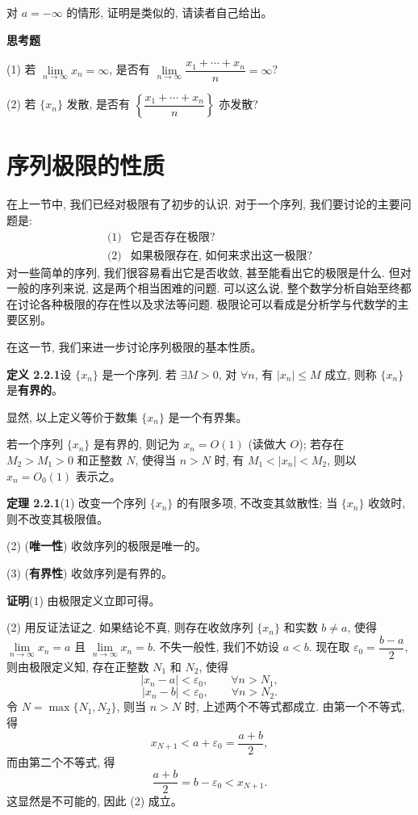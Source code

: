 \documentclass[UTF8,12pt,a4paper,fontset=fandol]{ctexart}
\begin{document}
对 $a=-\infty$ 的情形, 证明是类似的, 请读者自己给出。

\noindent\textbf{思考题}

(1) 若 $\lim\limits_{n\to\infty}x_n=\infty$, 是否有 $\lim\limits_{n\to\infty}\dfrac{x_1+\cdots+x_n}{n}=\infty$?

(2) 若 $\{x_n\}$ 发散, 是否有 $\left\{\dfrac{x_1+\cdots+x_n}{n}\right\}$ 亦发散?

\section{序列极限的性质}

在上一节中, 我们已经对极限有了初步的认识. 对于一个序列, 我们要讨论的主要问题是:
\[
\begin{array}{ll}
  \text{(1)} & \text{它是否存在极限?}\\
  \text{(2)} & \text{如果极限存在, 如何来求出这一极限?}
\end{array}
\]
对一些简单的序列, 我们很容易看出它是否收敛, 甚至能看出它的极限是什么. 但对一般的序列来说, 这是两个相当困难的问题. 可以这么说, 整个数学分析自始至终都在讨论各种极限的存在性以及求法等问题. 极限论可以看成是分析学与代数学的主要区别。

在这一节, 我们来进一步讨论序列极限的基本性质。

\noindent\textbf{定义 2.2.1}\quad 设 $\{x_n\}$ 是一个序列. 若 $\exists M>0$, 对 $\forall n$, 有 $|x_n|\leqslant M$ 成立, 则称 $\{x_n\}$ 是\textbf{有界的}。

显然, 以上定义等价于数集 $\{x_n\}$ 是一个有界集。

若一个序列 $\{x_n\}$ 是有界的, 则记为 $x_n=O(1)$ (读做大 $O$); 若存在 $M_2>M_1>0$ 和正整数 $N$, 使得当 $n>N$ 时, 有 $M_1<|x_n|<M_2$, 则以 $x_n=O_0(1)$ 表示之。

\noindent\textbf{定理 2.2.1}\quad (1) 改变一个序列 $\{x_n\}$ 的有限多项, 不改变其敛散性; 当 $\{x_n\}$ 收敛时, 则不改变其极限值。

(2) (\textbf{唯一性}) 收敛序列的极限是唯一的。

(3) (\textbf{有界性}) 收敛序列是有界的。

\noindent\textbf{证明}\quad (1) 由极限定义立即可得。

(2) 用反证法证之. 如果结论不真, 则存在收敛序列 $\{x_n\}$ 和实数 $b\ne a$, 使得 $\lim\limits_{n\to\infty}x_n=a$ 且 $\lim\limits_{n\to\infty}x_n=b$. 不失一般性, 我们不妨设 $a<b$. 现在取 $\varepsilon_0=\dfrac{b-a}{2}$, 则由极限定义知, 存在正整数 $N_1$ 和 $N_2$, 使得
\[
  |x_n-a|<\varepsilon_0,\qquad \forall n>N_1,
\]
\[
  |x_n-b|<\varepsilon_0,\qquad \forall n>N_2.
\]
令 $N=\max\{N_1,N_2\}$, 则当 $n>N$ 时, 上述两个不等式都成立. 由第一个不等式, 得
\[
  x_{N+1}<a+\varepsilon_0=\frac{a+b}{2},
\]
而由第二个不等式, 得
\[
  \frac{a+b}{2}=b-\varepsilon_0<x_{N+1}.
\]
这显然是不可能的, 因此 (2) 成立。
\end{document}
